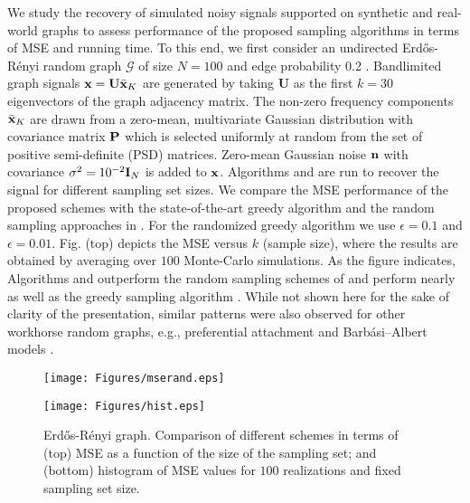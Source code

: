 We study the recovery of simulated noisy signals supported on synthetic and real-world graphs to assess performance of the proposed sampling algorithms in terms of MSE and running time. To this end, we first 
consider an undirected Erd\H{o}s-R\'enyi random graph $\mathcal{G}$ of size $N=100$ and edge probability 0.2 \cite{newman2010networks}. Bandlimited graph signals $\x = \U\bar{\x}_K$ are generated by taking $\mathbf{U}$ as the first $k=30$ eigenvectors of the graph adjacency matrix. The non-zero frequency components $\bar{\x}_K$ are drawn from a zero-mean, multivariate Gaussian distribution with covariance matrix $\P$ which is selected uniformly at random from the set of positive semi-definite (PSD) matrices.  Zero-mean Gaussian noise $\n$ with covariance $\sigma^2 = 10^{-2}\I_N$ is added to $\x$. Algorithms  and  are run to recover the signal for different sampling set sizes. We compare the MSE performance of the proposed schemes with the state-of-the-art greedy algorithm \cite{chamon2017greedy} and the random sampling approaches in \cite{chen2016signal}. For the randomized greedy algorithm we use $\epsilon = 0.1$ and $\epsilon = 0.01$.  Fig.  (top) depicts the MSE versus $k$ (sample size), where the results are obtained 
by averaging over $100$ Monte-Carlo simulations. As the figure indicates, Algorithms  and  outperform the random sampling schemes of \cite{chen2016signal} and perform nearly as well as the greedy sampling algorithm \cite{chamon2017greedy}. While not shown here for the sake of clarity of the presentation, similar patterns were also observed for other workhorse random graphs, e.g., preferential attachment and Barb\'asi--Albert models \cite{newman2010networks}.

\begin{figure}[t]
	\vspace{-0.3cm}
	\begin{minipage}[b]{\linewidth}
		\centering
		\texttt{[image: Figures/mserand.eps]}
	\end{minipage}
	\begin{minipage}[b]{\linewidth}
		\centering
		\texttt{[image: Figures/hist.eps]}
	\end{minipage}
	\vspace{-0.5cm}
	\caption{Erd\H{o}s-R\'enyi graph. Comparison of different schemes in terms of (top) MSE as a function of the size of the sampling set; and (bottom) histogram of MSE values for $100$ realizations and fixed sampling set size. }
	\label{fig:rand}
	\vspace{-0.3cm}
\end{figure}


